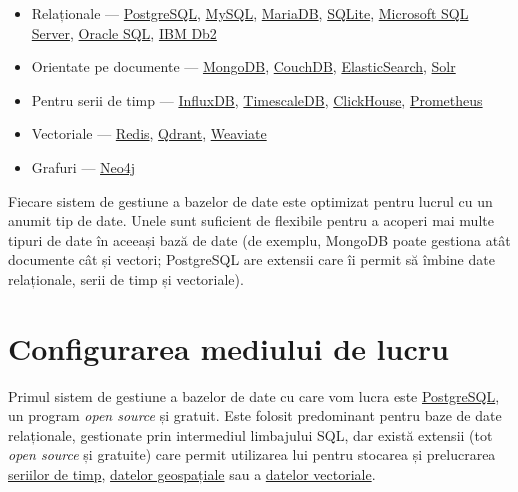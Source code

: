 \documentclass[a4paper, 12pt]{article}
\begin{document}
\begin{itemize}
    \item Relaționale --- \href{https://www.postgresql.org/}{PostgreSQL}, \href{https://www.mysql.com/}{MySQL}, \href{https://mariadb.org/}{MariaDB}, \href{https://sqlite.org/index.html}{SQLite}, \href{https://www.microsoft.com/en/sql-server}{Microsoft SQL Server}, \href{https://en.wikipedia.org/wiki/Oracle_Database}{Oracle SQL}, \href{https://www.ibm.com/products/db2}{IBM Db2}
    \item Orientate pe documente --- \href{https://www.mongodb.com/}{MongoDB}, \href{https://couchdb.apache.org/}{CouchDB}, \href{https://www.elastic.co/elasticsearch/}{ElasticSearch}, \href{https://solr.apache.org/}{Solr}
    \item Pentru serii de timp --- \href{https://www.influxdata.com/}{InfluxDB}, \href{https://github.com/timescale/timescaledb}{TimescaleDB}, \href{https://clickhouse.com/}{ClickHouse}, \href{https://prometheus.io/}{Prometheus}
    \item Vectoriale --- \href{https://redis.io/}{Redis}, \href{https://qdrant.tech/}{Qdrant}, \href{https://weaviate.io/}{Weaviate}
    \item Grafuri --- \href{https://neo4j.com/}{Neo4j}
\end{itemize}

Fiecare sistem de gestiune a bazelor de date este optimizat pentru lucrul cu un anumit tip de date. Unele sunt suficient de flexibile pentru a acoperi mai multe tipuri de date în aceeași bază de date (de exemplu, MongoDB poate gestiona atât documente cât și vectori; PostgreSQL are extensii care îi permit să îmbine date relaționale, serii de timp și vectoriale).

\section{Configurarea mediului de lucru}

Primul sistem de gestiune a bazelor de date cu care vom lucra este \href{https://www.postgresql.org/}{PostgreSQL}, un program \textit{open source} și gratuit. Este folosit predominant pentru baze de date relaționale, gestionate prin intermediul limbajului SQL, dar există extensii (tot \textit{open source} și gratuite) care permit utilizarea lui pentru stocarea și prelucrarea \href{https://github.com/timescale/timescaledb}{seriilor de timp}, \href{https://postgis.net/}{datelor geospațiale} sau a \href{https://github.com/pgvector/pgvector}{datelor vectoriale}.
\end{document}

